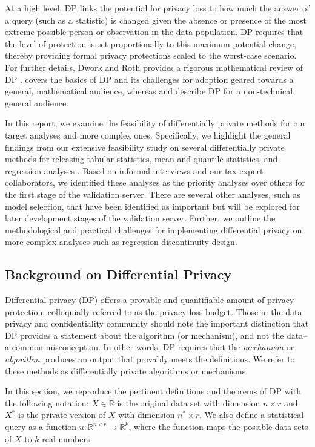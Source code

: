 At a high level, DP links the potential for privacy loss to how much the answer of a query (such as a statistic) is changed given the absence or presence of the most extreme possible person or observation in the data population. DP requires that the level of protection is set proportionally to this maximum potential change, thereby providing formal privacy protections scaled to the worst-case scenario. For further details, Dwork and Roth provides a rigorous mathematical review of DP \citep{dwork2014algorithmic}. \citet{bowen2021philosophy} covers the basics of DP and its challenges for adoption geared towards a general, mathematical audience, whereas \citet{nissim2017differential} and \citet{snoke2019differential} describe DP for a non-technical, general audience. 

In this report, we examine the feasibility of differentially private methods for our target analyses and more complex ones. Specifically, we highlight the general findings from our extensive feasibility study on several differentially private methods for releasing tabular statistics, mean and quantile statistics, and regression analyses \citep{barrientos2021}. Based on informal interviews and our tax expert collaborators, we identified these analyses as the priority analyses over others for the first stage of the validation server. There are several other analyses, such as model selection, that have been identified as important but will be explored for later development stages of the validation server. Further, we outline the methodological and practical challenges for implementing differential privacy on more complex analyses such as regression discontinuity design.

\subsection{Background on Differential Privacy}\label{subsec:dp}
Differential privacy (DP) offers a provable and quantifiable amount of privacy protection, colloquially referred to as the privacy loss budget. Those in the data privacy and confidentiality community should note the important distinction that DP provides a statement about the algorithm (or mechanism), and not the data--a common misconception. In other words, DP requires that the \textit{mechanism} or \textit{algorithm} produces an output that provably meets the definitions. We refer to these methods as differentially private algorithms or mechanisms.

In this section, we reproduce the pertinent definitions and theorems of DP with the following notation: $X\in\mathbb{R}$ is the original data set  with dimension ${n\times r}$ and $X^*$ is the private version of $X$ with dimension ${n^*\times r}$. We also define a statistical query as a function $u:\mathbb{R}^{n\times r}\rightarrow\mathbb{R}^k$, where the function maps the possible data sets of $X$ to $k$ real numbers.

